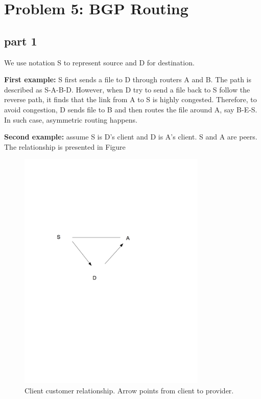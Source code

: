\section{Problem 5: BGP Routing}
\subsection{part 1}

We use notation S to represent source and D for destination.

\textbf{First example:} S first sends a file to D through routers A and B. The path is described as S-A-B-D. However, when D try to send a file back to S follow the reverse path, it finds that the link from A to S is highly congested. Therefore, to avoid congestion, D sends file to B and then routes the file around A, say B-E-S. In such case, asymmetric routing happens.

\textbf{Second example:} assume S is D's client and D is A's client. S and A are peers. The relationship is presented in Figure

\begin{figure}[h]
    \centering
    \includegraphics[trim = 0 360 40 90mm, clip, width=0.8\textwidth]{p5.png}
    \caption{Client customer relationship. Arrow points from client to provider.}
    \label{fig:p5}
\end{figure}

